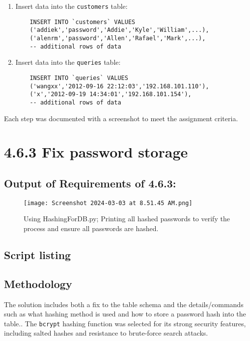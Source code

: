 \documentclass{article}
\begin{document}
\begin{enumerate}
    \item Insert data into the \texttt{customers} table:
    \begin{verbatim}
    INSERT INTO `customers` VALUES
    ('addiek','password','Addie','Kyle','William',...),
    ('alenrm','password','Allen','Rafael','Mark',...),
    -- additional rows of data
    \end{verbatim}

    \item Insert data into the \texttt{queries} table:
    \begin{verbatim}
    INSERT INTO `queries` VALUES
    ('wangxx','2012-09-16 22:12:03','192.168.101.110'),
    ('x','2012-09-19 14:34:01','192.168.101.154'),
    -- additional rows of data
    \end{verbatim}
\end{enumerate}

Each step was documented with a screenshot to meet the assignment criteria.

\section*{4.6.3 Fix password storage}

\subsection*{Output of Requirements of 4.6.3:}
\begin{figure}[H]
    \centering
    \texttt{[image: Screenshot 2024-03-03 at 8.51.45 AM.png]}
    \caption{Using HashingForDB.py; Printing all hashed passwords to verify the process and ensure all passwords are hashed.}
\end{figure}

\subsection*{Script listing}


\subsection*{Methodology}
The solution includes both a fix to the table schema and the details/commands such as what hashing
method is used and how to store a password hash into the table.. The \texttt{bcrypt} hashing function was selected for its strong security features, including salted hashes and resistance to brute-force search attacks.
\end{document}
